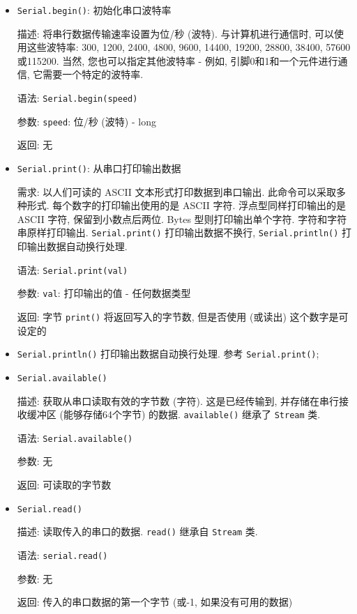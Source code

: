 \documentclass[openany, fontset=windowsold]{ctexbook}
\theoremstyle{kaiti}
\theoremstyle{normal}
\begin{document}
\begin{itemize}
  \item \verb|Serial.begin()|: 初始化串口波特率

  描述: 将串行数据传输速率设置为位/秒 (波特). 与计算机进行通信时, 可以使用这些波特率: 300, 1200, 2400, 4800, 9600, 14400, 19200, 28800, 38400, 57600或115200. 当然, 您也可以指定其他波特率 - 例如, 引脚0和1和一个元件进行通信, 它需要一个特定的波特率.

  语法: \verb|Serial.begin(speed)|

  参数: \verb|speed|: 位/秒 (波特) - long

  返回: 无

  \item \verb|Serial.print()|: 从串口打印输出数据

  需求: 以人们可读的 ASCII 文本形式打印数据到串口输出. 此命令可以采取多种形式. 每个数字的打印输出使用的是 ASCII 字符. 浮点型同样打印输出的是 ASCII 字符, 保留到小数点后两位. Bytes 型则打印输出单个字符. 字符和字符串原样打印输出. \verb|Serial.print()| 打印输出数据不换行, \verb|Serial.println()| 打印输出数据自动换行处理.

  语法: \verb|Serial.print(val)|

  参数: \verb|val|: 打印输出的值 - 任何数据类型

  返回: 字节 \verb|print()| 将返回写入的字节数, 但是否使用 (或读出) 这个数字是可设定的

  \item \verb|Serial.println()| 打印输出数据自动换行处理. 参考 \verb|Serial.print()|;

  \item \verb|Serial.available()|

  描述: 获取从串口读取有效的字节数 (字符). 这是已经传输到, 并存储在串行接收缓冲区 (能够存储64个字节) 的数据.  \verb|available()| 继承了 \verb|Stream| 类.

  语法: \verb|Serial.available()|

  参数: 无

  返回: 可读取的字节数

  \item \verb|Serial.read()|

  描述: 读取传入的串口的数据. \verb|read()| 继承自 \verb|Stream| 类.

  语法: \verb|serial.read()|

  参数: 无

  返回: 传入的串口数据的第一个字节 (或-1, 如果没有可用的数据) 
\end{itemize}
\end{document}
